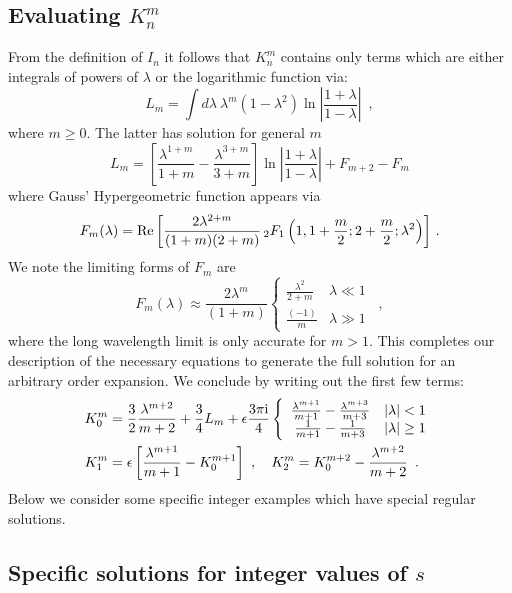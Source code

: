 \documentclass[a4paper,fleqn,usenatbib]{mnras}
\newcommand{\eqnb}{\begin{equation*}}
\newcommand{\eqne}{\end{equation*}}
\begin{document}
\subsection{Evaluating $K_n^m$}

From the definition of $I_n$ it follows that $K_n^m$ contains only terms which are either integrals of powers of $\lambda$ or the logarithmic function via:
\eqnb
L_m = \int d\lambda ~\lambda^m \left(1-\lambda^2\right)\ln\left|\frac{1+\lambda}{1-\lambda} \right|  \enspace ,
\eqne
where $m\geq 0$. The latter has solution for general $m$
\eqnb
L_m= \left[\frac{\lambda^{1+m}}{1+m}- \frac{\lambda^{3+m}}{3+m}\right]\ln\left|\frac{1+\lambda}{1-\lambda} \right|
+F_{m+2} - F_{m}
\eqne
where Gauss'  Hypergeometric function appears via
\eqnb
F_m(\lambda) = {\rm Re}\left[\frac{2 \lambda^{2+m}}{(1+m)(2+m)}
\,_2F_1\left(1, 1+\frac{m}{2};2+\frac{m}{2};\lambda^2\right)
\right]\, .
\eqne
We note the limiting forms of $F_m$ are
\eqnb
F_m(\lambda) \approx  \frac{2\lambda^{m} }{(1+m)} \left\lbrace \begin{array}{cc}
  \frac{\lambda^{2}}{2+m}&  \lambda \ll 1 \\
\frac{(-1) }{m} &  \lambda \gg 1 
\end{array}\right. \enspace ,
\eqne
where the long wavelength limit is only accurate for $m>1$.
\noindent 
This completes our description of the necessary equations to generate the full solution for an arbitrary order expansion. We conclude by writing out the first few terms:
\begin{align}
&K_0^m = \frac{3}{2} \frac{\lambda^{m+2}}{m+2}+\frac{3}{4}L_m +\epsilon\frac{3\pi {\rm i}}{4} \left\lbrace \begin{array}{cc}
   \frac{\lambda^{m+1}}{m+1} - \frac{\lambda^{m+3}}{m+3} &  |\lambda| < 1 \\
  \frac{1}{m+1} - \frac{1}{m+3} &  |\lambda| \geq 1 
\end{array}\right.  \nonumber\\
&K_1^m = \epsilon\left[ \frac{\lambda^{m+1}}{m+1} - K_0^{m+1}\right]~, \enspace \enspace
\label{K2}
K_2^m = K_0^{m+2} -  \frac{\lambda^{m+2}}{m+2}  \enspace .
\end{align}
Below we consider some specific integer examples which have special regular solutions.

\subsection{Specific solutions for integer values of $s$ }
\end{document}
